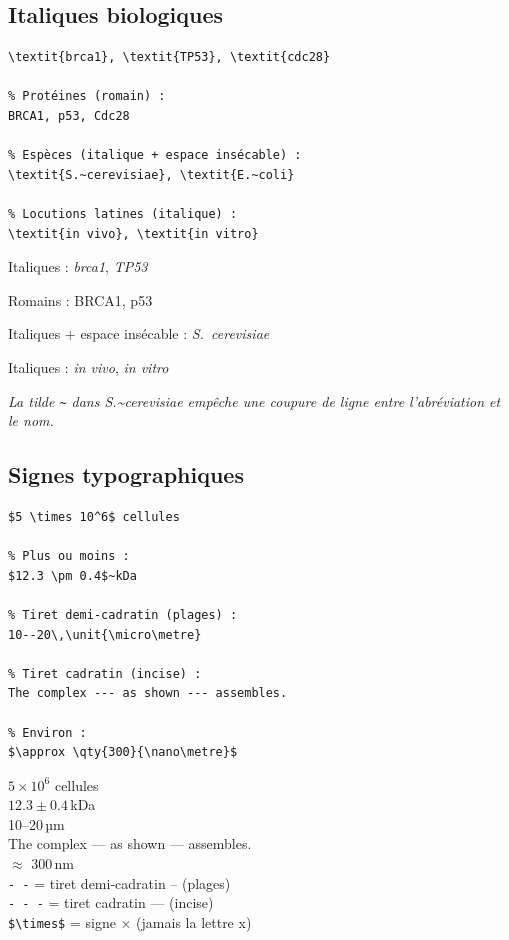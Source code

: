 \documentclass[12pt, a4paper]{article}
\begin{document}
\subsection{Italiques biologiques}

\begin{demo}
\begin{lstlisting}[style=latexcode]
% Gènes (italique) :
\textit{brca1}, \textit{TP53}, \textit{cdc28}

% Protéines (romain) :
BRCA1, p53, Cdc28

% Espèces (italique + espace insécable) :
\textit{S.~cerevisiae}, \textit{E.~coli}

% Locutions latines (italique) :
\textit{in vivo}, \textit{in vitro}
\end{lstlisting}
\tcblower
\footnotesize
\begin{description}[noitemsep]
  \item[Gènes] Italiques : \textit{brca1}, \textit{TP53}
  \item[Protéines] Romains : BRCA1, p53
  \item[Espèces] Italiques + espace insécable : \textit{S.~cerevisiae}
  \item[Latin] Italiques : \textit{in vivo}, \textit{in vitro}
\end{description}
\medskip
\itshape La tilde \texttt{\textasciitilde} dans \textit{S.\textasciitilde{}cerevisiae} empêche une coupure de ligne entre l'abréviation et le nom.
\end{demo}

\subsection{Signes typographiques}

\begin{demo}
\begin{lstlisting}[style=latexcode]
% Multiplication (pas la lettre x) :
$5 \times 10^6$ cellules

% Plus ou moins :
$12.3 \pm 0.4$~kDa

% Tiret demi-cadratin (plages) :
10--20\,\unit{\micro\metre}

% Tiret cadratin (incise) :
The complex --- as shown --- assembles.

% Environ :
$\approx \qty{300}{\nano\metre}$
\end{lstlisting}
\tcblower
$5 \times 10^6$ cellules\\[8pt]
$12.3 \pm 0.4$\,kDa\\[8pt]
10–20\,µm\\[8pt]
The complex --- as shown --- assembles.\\[8pt]
$\approx$ 300\,nm\\[12pt]
{\footnotesize
\texttt{-\,-} = tiret demi-cadratin – (plages)\\
\texttt{-\,-\,-} = tiret cadratin — (incise)\\
\texttt{\$\textbackslash times\$} = signe × (jamais la lettre x)}
\end{demo}
\end{document}
